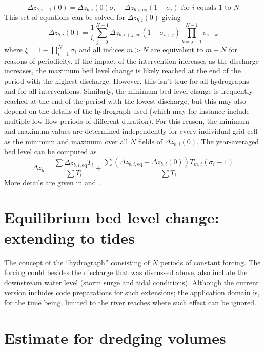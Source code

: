 %
\begin{equation}
\Delta z_{b,i+1}(0) = \Delta z_{b,i}(0) \sigma_i + \Delta z_{b,i,\text{eq}} (1-\sigma_i) \text{ for $i$ equals 1 to $N$}
\label{Eq:zbiNPeriods}
\end{equation}
%
This set of equations can be solved for $\Delta z_{b,i}(0)$ giving
%
\begin{equation}
\Delta z_{b,i}(0) = \frac{1}{\xi} \sum_{j=0}^{N-1} \Delta z_{b,i+j,\text{eq}} (1-\sigma_{i+j}) \prod_{k=j+1}^{N-1} \sigma_{i+k}
\end{equation}
%
where $\xi = 1 - \prod_{i=1}^N \sigma_i$ and all indices $m>N$ are equivalent to $m-N$ for reasons of periodicity.
If the impact of the intervention increases as the discharge increases, the maximum bed level change is likely reached at the end of the period with the highest discharge.
However, this isn't true for all hydrographs and for all interventions.
Similarly, the minimum bed level change is frequently reached at the end of the period with the lowest discharge, but this may also depend on the details of the hydrograph used (which may for instance include multiple low flow periods of different duration).
For this reason, the minimum and maximum values are determined independently for every individual grid cell as the minimum and maximum over all $N$ fields of $\Delta z_{b,i}(0)$.
The year-averaged bed level can be computed as
%
\begin{equation}
\bar{\Delta z_b} = \frac{\sum{\Delta z_{b,i,\text{eq}} T_i}}{\sum{T_i}} + \frac{\sum{(\Delta z_{b,i,\text{eq}} - \Delta z_{b,i}(0)) T_{m,i} (\sigma_i-1)}}{\sum{T_i}}
\label{Eq:zbMean}
\end{equation}
%
More details are given in \citet{JagersGiri2022} and \citet{dfmi3_valdoc}.


\section{Equilibrium bed level change: extending to tides}\label{Sec:Tides}

The concept of the ``hydrograph'' consisting of $N$ periods of constant forcing.
The forcing could besides the discharge that was discussed above, also include the downstream water level (storm surge and tidal conditions).
Although the current \dfastmi version includes code preparations for such extensions; the application domain is, for the time being, limited to the river reaches where such effect can be ignored.


\section{Estimate for dredging volumes}\label{Sec:DredgeVol}

